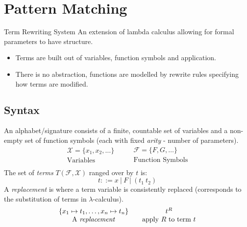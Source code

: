 \chapter{Pattern Matching}

\begin{definitionbox}{Term Rewriting System}
	An extension of lambda calculus allowing for formal parameters to have structure.
	\begin{itemize}
		\item Terms are built out of variables, function symbols and application.
		\item There is no abstraction, functions are modelled by rewrite rules specifying how terms are modified.
	\end{itemize}
\end{definitionbox}

\section{Syntax}

An alphabet/signature consists of a finite, countable set of variables and a non-empty set of function symbols (each with fixed \textit{arity} - number of parameters).
\[\begin{matrix}
		\mathcal{X} = \{x_1, x_2, \dots\} \\
		\text{Variables}                  \\
	\end{matrix} \qquad \begin{matrix}
		\mathcal{F} = \{F, G, \dots\} \\
		\text{Function Symbols}       \\
	\end{matrix}\]
The set of \textit{terms} $T(\mathcal{F}, \mathcal{X})$ ranged over by $t$ is:
\[t ::= x \ | \ F \ | \ (t_1 \ t_2)\]
A \textit{replacement} is where a term variable is consistently replaced (corresponds to the substitution of terms in $\lambda$-calculus).
\[\begin{matrix}
		\{x_1 \mapsto t_1, \dots , x_n \mapsto t_n\} \\
		\text{A \textit{replacement}}                \\
	\end{matrix} \qquad \begin{matrix}
		t^R                          \\
		\text{apply $R$ to term $t$} \\
	\end{matrix}\]

